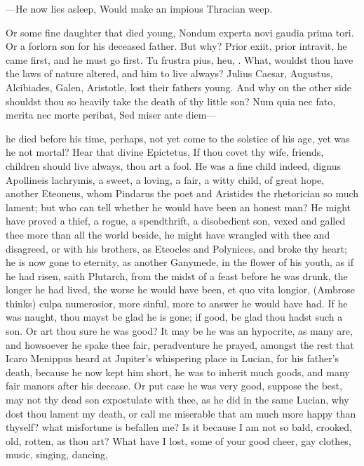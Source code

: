{---He now lies asleep,
Would make an impious Thracian weep.

Or some fine daughter that died young, Nondum experta novi gaudia prima
tori. Or a forlorn son for his deceased father. But why? Prior exiit,
prior intravit, he came first, and he must go first. Tu frustra
pius, heu, \etc{}. What, wouldst thou have the laws of nature altered, and
him to live always? Julius Caesar, Augustus, Alcibiades, Galen,
Aristotle, lost their fathers young. And why on the other side shouldst
thou so heavily take the death of thy little son?
Num quia nec fato, merita nec morte peribat,
Sed miser ante diem---

he died before his time, perhaps, not yet come to the solstice of his
age, yet was he not mortal? Hear that divine Epictetus, If thou
covet thy wife, friends, children should live always, thou art a fool.
He was a fine child indeed, dignus Apollineis lachrymis, a sweet, a
loving, a fair, a witty child, of great hope, another Eteoneus, whom
Pindarus the poet and Aristides the rhetorician so much lament; but who
can tell whether he would have been an honest man? He might have proved
a thief, a rogue, a spendthrift, a disobedient son, vexed and galled
thee more than all the world beside, he might have wrangled with thee
and disagreed, or with his brothers, as Eteocles and Polynices, and
broke thy heart; he is now gone to eternity, as another Ganymede, in
the flower of his youth, as if he had risen, saith
Plutarch, from the midst of a feast before he was drunk, the
longer he had lived, the worse he would have been, et quo vita longior,
(Ambrose thinks) culpa numerosior, more sinful, more to answer he would
have had. If he was naught, thou mayst be glad he is gone; if good, be
glad thou hadst such a son. Or art thou sure he was good? It may be he
was an hypocrite, as many are, and howsoever he spake thee fair,
peradventure he prayed, amongst the rest that Icaro Menippus heard at
Jupiter's whispering place in Lucian, for his father's death, because
he now kept him short, he was to inherit much goods, and many fair
manors after his decease. Or put case he was very good, suppose the
best, may not thy dead son expostulate with thee, as he did in the same
Lucian, why dost thou lament my death, or call me miserable that
am much more happy than thyself? what misfortune is befallen me? Is it
because I am not so bald, crooked, old, rotten, as thou art? What have
I lost, some of your good cheer, gay clothes, music, singing, dancing,
}
